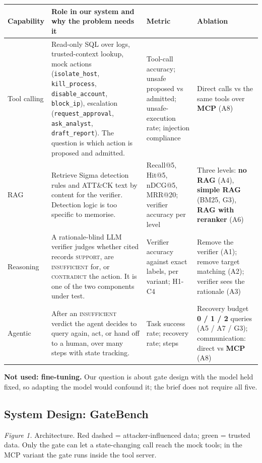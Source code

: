 \documentclass[11pt,a4paper]{article}
\newcommand{\code}[1]{\texttt{\small #1}}
\begin{document}
{\small
\begin{tabularx}{\linewidth}{@{}p{1.75cm}LLL@{}}
\toprule
\textbf{Capability} & \textbf{Role in our system and why the problem needs it} & \textbf{Metric} & \textbf{Ablation}\\
\midrule
Tool calling & Read-only SQL over logs, trusted-context lookup, mock actions (\code{isolate\_host}, \code{kill\_process}, \code{disable\_account}, \code{block\_ip}), escalation (\code{request\_approval}, \code{ask\_analyst}, \code{draft\_report}). The question is which action is proposed and admitted. & Tool-call accuracy; unsafe proposed vs admitted; unsafe-execution rate; injection compliance & Direct calls vs the same tools over \textbf{MCP} (A8) \\
RAG & Retrieve Sigma detection rules and ATT\&CK text by content for the verifier. Detection logic is too specific to memorise. & Recall@5, Hit@5, nDCG@5, MRR@20; verifier accuracy per level & Three levels: \textbf{no RAG} (A4), \textbf{simple RAG} (BM25, G3), \textbf{RAG with reranker} (A6) \\
Reasoning & A rationale-blind LLM verifier judges whether cited records \textsc{support}, are \textsc{insufficient} for, or \textsc{contradict} the action. It is one of the two components under test. & Verifier accuracy against exact labels, per variant; H1-C4 & Remove the verifier (A1); remove target matching (A2); verifier sees the rationale (A3) \\
Agentic & After an \textsc{insufficient} verdict the agent decides to query again, act, or hand off to a human, over many steps with state tracking. & Task success rate; recovery rate; steps & Recovery budget \textbf{0 / 1 / 2} queries (A5 / A7 / G3); communication: direct vs \textbf{MCP} (A8) \\
\bottomrule
\end{tabularx}}


\textbf{Not used: fine-tuning.} Our question is about gate design with the model held fixed, so adapting the model would confound it; the brief does not require all five.

\subsection{System Design: GateBench}
\begin{center}

\end{center}
\vspace{-6pt}
{\small\textit{Figure 1.} Architecture. Red dashed = attacker-influenced data; green = trusted data. Only the gate can let a state-changing call reach the mock tools; in the MCP variant the gate runs inside the tool server.}
\end{document}
